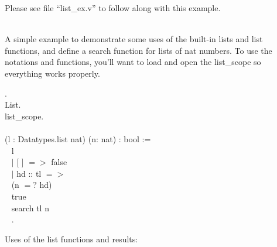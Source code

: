 
Please see file ``list\_ex.v'' to follow along with this example. 

~\\
A simple example to demonstrate some uses of the built-in lists and list functions, and define a search function for lists of nat numbers. To use the notations and functions, you'll want to load  and open the list\_scope so everything works properly.

\begin{code}
	 .				\\
	 List. 							\\
	 list\_scope.					\\
	\\
	\Fixpoint {} (l : Datatypes.list nat) (n: nat) : bool :=  	\\ \-\ \quad
	  \match l \with 								\\ \-\ \qquad
	   $\mid$ [ ] $=>$ false						\\ \-\ \qquad
	   $\mid$ hd :: tl $=>$ 						\\ \-\ \qquad\qquad
	      \If (n $=?$ hd)							\\ \-\ \qquad\qquad
	      \Then true								\\ \-\ \qquad\qquad
	      \Else search tl n							\\ \-\ \quad
	  \End.									
\end{code}

\noindent
Uses of the list functions and results:
	  
